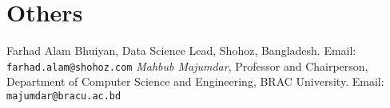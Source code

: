 \documentclass[11pt,a4paper]{moderncv}
\begin{document}
\section{Others}


\begin{thebibliography}{99}
	 Farhad Alam Bhuiyan, Data Science Lead, Shohoz, Bangladesh. Email: \texttt{farhad.alam@shohoz.com}
	 \textit{Mahbub Majumdar}, Professor and Chairperson, Department of Computer Science and Engineering, BRAC University. Email: \texttt{majumdar@bracu.ac.bd}
\end{thebibliography}
\nocite{*}
\end{document}
